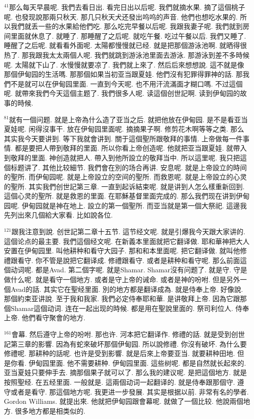 \documentclass{book}
\begin{document}
$^{41}$那么每天早晨呢.
我們去看日出.
看完日出以后呢.
我們就摘水果.
摘了這個桃子呢.
也發现說那兩只秋天.
那几只秋天犬还發出呜呜的声音.
他們也想吃水果的.
所以我們就丢一些的水果給他們吃.
那么吃完早餐以后呢.
我跟我妻子呢.
我們就到房间里面就休息了.
就睡了.
那睡醒了之后呢.
就吃午餐.
吃过午餐以后.
我們又睡了.
睡醒了之后呢.
就看看外面呢.
太陽都慢慢就已经.
就是把那個游泳池啊.
就晒得很热了.
那我跟我太太兩個人呢.
我們就跳到游泳池里面去游泳.
那游泳到差不多時候呢.
太陽就下山了.
水慢慢就要凉了.
我們就上來了.
然后后來想想說.
這不就是像那個伊甸园的生活嗎.
那那個如果当初亚当跟夏娃.
他們沒有犯罪得罪神的話.
那我們不是就可以在伊甸园里面.
一直到今天呢.
也不用汗流滿面才糊口嗎.
不过這個呢.
就帶來我們今天這個主题了.
我們很多人呢.
读這個创世記啊.
读到伊甸园的故事的時候.

$^{81}$就有一個问题.
就是上帝為什么造了亚当之后.
就把他放在伊甸园.
是不是看亚当夏娃呢.
闲得沒事干.
放在伊甸园里面呢.
摘摘果子啊.
修剪花木啊等等之类.
那么其实我今天要讲到.
等下我就會讲到.
關于這個聖所跟敬拜的事情.
上帝做每一件事情.
都是要把人帶到敬拜的里面.
所以你看上帝创造呢.
他就把亚当跟夏娃.
就帶入到敬拜的里面.
神创造就把人.
帶入到他所設立的敬拜当中.
所以這里呢.
我只把這個标题讲了.
其他比较細节.
我們會在別的场合再讲.
安息呢.
就是上帝設立的時间的聖所.
而伊甸园呢.
就是上帝設立的空间的聖所.
而救恩呢.
就是上帝設立的心灵的聖所.
其实我們创世記第三章.
一直到起诉結束呢.
就是讲到人怎么樣重新回到.
這個心灵的聖所.
就是救恩的里面.
在耶穌基督里面完成的.
那么我們现在讲到伊甸园呢.
伊甸园就是神在地上.
設立的第一個聖所.
而亚当就是第一個大祭祀.
這邊我先列出來几個給大家看.
比如說各位.

$^{121}$跟我注意到說.
创世記第二章十五节.
這节经文呢.
就是引爆我今天跟大家讲的.
這個论点的最主要.
我們這個经文呢.
在新義本里面就把它翻译做.
耶和華神把大人安置在伊甸园里.
叫他耕种和看守大园子.
那和和本里面呢.
把它翻译做.
就叫他修禮跟看守.
你不管是說把它翻译成.
修禮跟看守.
或者是耕种和看守呢.
那么前面這個动词呢.
都是Avad.
第二個字呢.
就是Shamar.
Shamar沒有问题了.
就是守.
守是做什么呢.
就是看守一個地方.
或者是守上帝的诫命.
或者是神的吩咐.
但是另外一個Avad的話.
其实它在聖经里面.
別的地方都是翻译成為.
就是侍奉上帝.
好像說.
那個約束亚讲說.
至于我和我家.
我們必定侍奉耶和華.
是讲敬拜上帝.
因為它跟那個Shamar這個动词.
连在一起出现的時候.
都是用在聖說里面的.
祭司利位人.
侍奉上帝.
他們看守聚會的地方.

$^{161}$會幕.
然后遵守上帝的吩咐.
那也许.
河本把它翻译作.
修禮的話.
就是受到创世記第三章的影響.
因為有蛇來破坏那個伊甸园.
所以說修禮.
你沒有破坏.
為什么要修禮呢.
那耕种的話呢.
也许是受到影響.
就是后來上帝要亚当.
就要耕种田地.
但是你看.
伊甸园里面.
他不需要耕种.
伊甸园里面.
這些树呢.
都是自然就长起來的.
亚当夏娃只要伸手去.
摘那個果子就可以了.
那么我的建议呢.
是把這個地方.
就是按照聖经.
在五经里面.
一般就是.
這兩個动词一起翻译的.
就是侍奉跟那個守.
遵守或者是看守.
那這個地方呢.
我更进一步發展.
其实是根据以前.
非常有名的學者.
Gordon Williams.
就提出來.
他就把伊甸园跟會幕呢.
就做了一個比较.
他說兩個地方.
很多地方都是相类似的.
\end{document}
